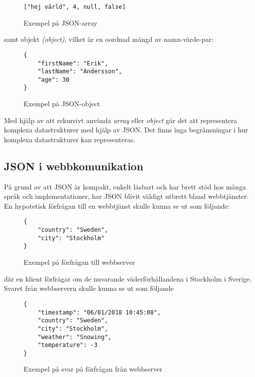 \documentclass[swedish]{kththesis}
\begin{document}
\begin{figure}[h]
	\begin{verbatim}
["hej värld", 4, null, false]
	\end{verbatim}
	\vspace{-1.5em}
	\caption{Exempel på JSON-array}
\end{figure}

\noindent
samt objekt \textit{(object)}, vilket är en oordnad mängd av namn-värde-par:

\begin{figure}[h]
	\begin{verbatim}
{
	"firstName": "Erik",
	"lastName": "Andersson",
	"age": 30
}
	\end{verbatim}
	\vspace{-1.5em}
	\caption{Exempel på JSON-object}
	\label{fig:json-object-example}
\end{figure}

\noindent
Med hjälp av att rekursivt använda \textit{array} eller \textit{object} går det att representera komplexa datastrukturer med hjälp av JSON. Det finns inga begränsningar i hur komplexa datastrukturer kan representeras.

\subsection{JSON i webbkomunikation}
\label{sec:intr:bakgrund:json-web}
På grund av att JSON är kompakt, enkelt läsbart och har brett stöd hos många språk och implementationer, har JSON blivit väldigt utbrett bland webbtjänster. En hypotetisk förfrågan till en webbtjänst skulle kunna se ut som följande:

\begin{figure}[h]
	\begin{verbatim}
{
	"country": "Sweden",
	"city": "Stockholm"
}
	\end{verbatim}
	\vspace{-1.5em}
	\caption{Exempel på förfrågan till webbserver}
\end{figure}

\noindent
där en klient förfrågar om de nuvarande väderförhållandena i Stockholm i Sverige. Svaret från webbservern skulle kunna se ut som följande

\begin{figure}[h]
	\begin{verbatim}
{
	"timestamp": "06/01/2018 10:45:08",
	"country": "Sweden",
	"city": "Stockholm",
	"weather": "Snowing",
	"temperature": -3
}
	\end{verbatim}
	\vspace{-1.5em}
	\caption{Exempel på svar på förfrågan från webbserver}
\end{figure}
\end{document}

